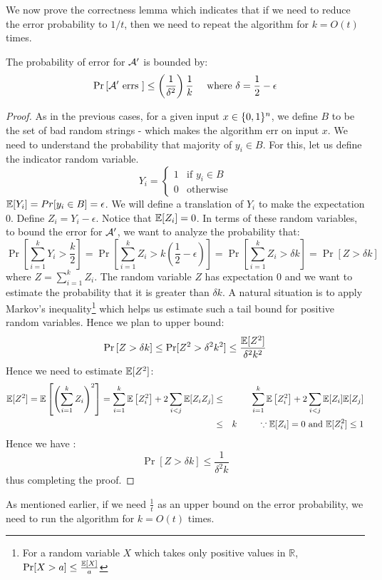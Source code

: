 We now prove the correctness lemma which indicates that if we need to reduce the error probability to $1/t$, then we need to repeat the algorithm for $k=O(t)$ times.
\begin{lemma}
\label{lem:paiewise-amplification}
The probability of error for ${\cal A}'$ is bounded by:
$$\Pr\left[{\cal A}' \textrm{ errs }\right] \le \left(\frac{1}{\delta^2}\right)\frac{1}{k} \textrm{~~~~where $\delta = \frac{1}{2}-\epsilon$}$$
\end{lemma}
\begin{proof}
As in the previous cases, for a given input $x \in \{0,1\}^n$, we define $B$ to be the set of bad random strings - which makes the algorithm err on input $x$. We need to understand the probability that majority of $y_i \in B$. For this, let us define the indicator random variable.
\[
    Y_i = 
\begin{cases}
    1 & \text{if $y_i \in B$} \\
    0 & \text{otherwise}
\end{cases}
\]
${\mathbb E}[Y_i] = Pr[y_i \in B] = \epsilon$. We will define a translation of $Y_i$ to make the expectation $0$. Define $Z_i = Y_i - \epsilon$. Notice that ${\mathbb E}[Z_i]=0$. In terms of these random variables, to bound the error for ${\cal A}'$, we want to analyze the probability that:
$$\Pr \left[ \sum_{i=1}^k Y_i > \frac{k}{2}\right] = \Pr \left[ \sum_{i=1}^k Z_i > k\left(\frac{1}{2}-\epsilon\right) \right] = \Pr \left[ \sum_{i=1}^k Z_i > \delta k \right] =\Pr \left[ Z > \delta k \right] $$
where $Z = \sum_{i=1}^k Z_i$.
The random variable $Z$ has expectation $0$ and we want to estimate the probability that it is greater than $\delta k$. A natural situation is to apply Markov's inequality\footnote{For a random variable $X$ which takes only positive values in $\mathbb{R}$, $\Pr[X > a] \le \frac{{\mathbb E}[X]}{a}$} which helps us estimate such a tail bound for positive random variables.
Hence we plan to upper bound:
\begin{eqnarray*}
\Pr \left[ Z > \delta k \right] \le \Pr[Z^2 > \delta^2 k^2] \le \frac{{\mathbb E}[Z^2]}{\delta^2k^2}
\end{eqnarray*}
Hence we need to estimate ${\mathbb E}[Z^2]$:
\begin{eqnarray*}
{\mathbb E}[Z^2] = {\mathbb E}\left[ \left(\sum_{i=1}^k Z_i\right)^2 \right] = \sum_{i=1}^k {\mathbb E}\left[Z_i^2\right] + 2\sum_{i<j} {\mathbb E}[Z_iZ_j] & \le & \sum_{i=1}^k {\mathbb E}\left[Z_i^2\right] + 2\sum_{i<j} {\mathbb E}[Z_i]{\mathbb E}[Z_j] \\
& \le & k \textrm{~~~~~~~~$\because {\mathbb E}[Z_i] = 0$ and ${\mathbb E}[Z_i^2] \le 1$}
\end{eqnarray*}
Hence we have :
$$\Pr \left[ Z > \delta k \right] \le \frac{1}{\delta^2 k}$$
thus completing the proof.
\end{proof}
\begin{remark}
As mentioned earlier, if we need $\frac{1}{t}$ as an upper bound on the error probability, we need to run the algorithm for $k=O(t)$ times.
\end{remark}


